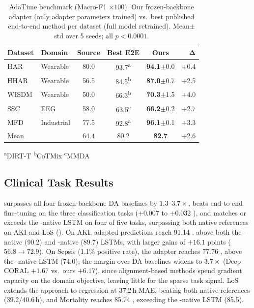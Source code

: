 \begin{table}[!htbp]
\centering
\setlength{\tabcolsep}{4pt}
\caption{AdaTime benchmark (Macro-F1 $\times 100$). Our frozen-backbone adapter (only adapter parameters trained) vs.\ best published end-to-end method per dataset (full model retrained). Mean$\pm$std over 5 seeds; all $p < 0.0001$.}
\label{tab:adatime}
\vskip 0.1in
\footnotesize
\begin{tabular}{@{}ll ccc r@{}}
\toprule
\textbf{Dataset} & \textbf{Domain} & \textbf{Source} & \textbf{Best E2E} & \textbf{Ours} & $\boldsymbol{\Delta}$ \\
\midrule
HAR & Wearable & 80.0 & 93.7\textsuperscript{a} & \textbf{94.1}{\scriptsize$\pm$0.0} & +0.4 \\
HHAR & Wearable & 56.5 & 84.5\textsuperscript{b} & \textbf{87.0}{\scriptsize$\pm$0.7} & +2.5 \\
WISDM & Wearable & 50.0 & 66.3\textsuperscript{b} & \textbf{70.3}{\scriptsize$\pm$1.5} & +4.0 \\
SSC & EEG & 58.0 & 63.5\textsuperscript{c} & \textbf{66.2}{\scriptsize$\pm$0.2} & +2.7 \\
MFD & Industrial & 77.5 & 92.8\textsuperscript{a} & \textbf{96.1}{\scriptsize$\pm$0.1} & +3.3 \\
\midrule
Mean & & 64.4 & 80.2 & \textbf{82.7} & +2.6 \\
\bottomrule
\end{tabular}

\vskip 0.05in
{\scriptsize \textsuperscript{a}DIRT-T \quad \textsuperscript{b}CoTMix \quad \textsuperscript{c}MMDA}
\end{table}

\subsection{Clinical Task Results}
\label{sec:main-results}

\retr{} surpasses all four frozen-backbone DA baselines by $1.3$--$3.7\times$, beats end-to-end fine-tuning on the three classification tasks ($+0.007$ to $+0.032$ \aucroc{}), and matches or exceeds the \eicu{}-native LSTM on four of five tasks, surpassing both native references on AKI and LoS ().
On AKI, adapted predictions reach 91.14 \aucroc{}, above both the \eicu{}-native (90.2) and \mimic{}-native (89.7) LSTMs, with larger \aucpr{} gains of $+16.1$ points ($56.8 \to 72.9$).
On Sepsis (1.1\% positive rate), the adapter reaches 77.76 \aucroc{}, above the \eicu{}-native LSTM (74.0); the margin over DA baselines widens to $3.7\times$ (Deep CORAL $+1.67$ vs.\ ours $+6.17$), since alignment-based methods spend gradient capacity on the domain objective, leaving little for the sparse task signal.
LoS extends the approach to regression at 37.2\,h MAE, beating both native references (39.2/40.6\,h), and Mortality reaches 85.74 \aucroc{}, exceeding the \eicu{}-native LSTM (85.5).

